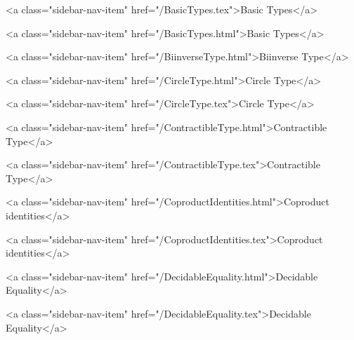           <a class="sidebar-nav-item" href="/BasicTypes.tex">Basic Types</a>
        
      
    
      
        
          <a class="sidebar-nav-item" href="/BasicTypes.html">Basic Types</a>
        
      
    
      
        
          <a class="sidebar-nav-item" href="/BiinverseType.html">Biinverse Type</a>
        
      
    
      
        
          <a class="sidebar-nav-item" href="/CircleType.html">Circle Type</a>
        
      
    
      
        
          <a class="sidebar-nav-item" href="/CircleType.tex">Circle Type</a>
        
      
    
      
        
          <a class="sidebar-nav-item" href="/ContractibleType.html">Contractible Type</a>
        
      
    
      
        
          <a class="sidebar-nav-item" href="/ContractibleType.tex">Contractible Type</a>
        
      
    
      
        
          <a class="sidebar-nav-item" href="/CoproductIdentities.html">Coproduct identities</a>
        
      
    
      
        
          <a class="sidebar-nav-item" href="/CoproductIdentities.tex">Coproduct identities</a>
        
      
    
      
        
          <a class="sidebar-nav-item" href="/DecidableEquality.html">Decidable Equality</a>
        
      
    
      
        
          <a class="sidebar-nav-item" href="/DecidableEquality.tex">Decidable Equality</a>
        
      
    
